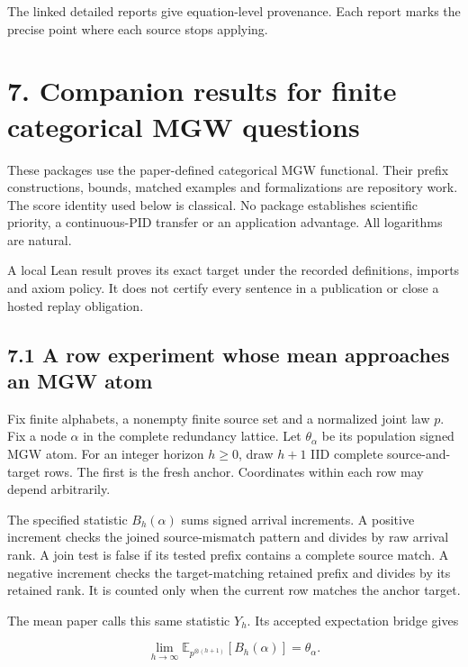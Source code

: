\documentclass[
  11pt,
  a4paper,
]{article}
\newcounter{none} %
\begin{document}
The linked detailed reports give equation-level provenance. Each report
marks the precise point where each source stops applying.

\clearpage

\section{7. Companion results for finite categorical MGW
questions}\label{7-companion-results-for-finite-categorical-mgw-questions}

These packages use the paper-defined categorical MGW functional. Their
prefix constructions, bounds, matched examples and formalizations are
repository work. The score identity used below is classical. No package
establishes scientific priority, a continuous-PID transfer or an
application advantage. All logarithms are natural.

A local Lean result proves its exact target under the recorded
definitions, imports and axiom policy. It does not certify every
sentence in a publication or close a hosted replay obligation.


\subsection{7.1 A row experiment whose mean approaches an MGW
atom}\label{71-a-row-experiment-whose-mean-approaches-an-mgw-atom}

Fix finite alphabets, a nonempty finite source set and a normalized
joint law \(p\). Fix a node \(\alpha\) in the complete redundancy
lattice. Let \(\theta_\alpha\) be its population signed MGW atom. For an
integer horizon \(h\ge0\), draw \(h+1\) IID complete source-and-target
rows. The first is the fresh anchor. Coordinates within each row may
depend arbitrarily.

The specified statistic \(B_h(\alpha)\) sums signed arrival increments.
A positive increment checks the joined source-mismatch pattern and
divides by raw arrival rank. A join test is false if its tested prefix
contains a complete source match. A negative increment checks the
target-matching retained prefix and divides by its retained rank. It is
counted only when the current row matches the anchor target.

The mean paper calls this same statistic \(Y_h\). Its accepted
expectation bridge gives

\[
\lim_{h\to\infty}\mathbb E_{p^{\otimes(h+1)}}[B_h(\alpha)]
=\theta_\alpha.
\]
\end{document}
